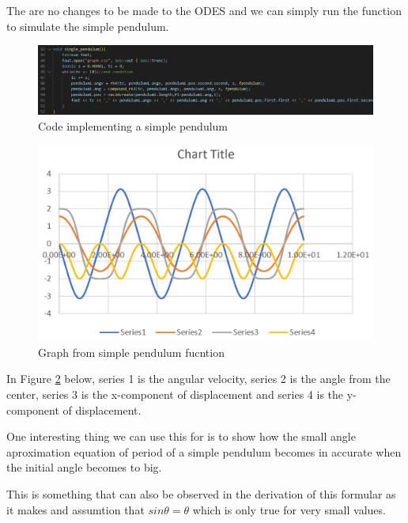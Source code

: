 \documentclass[12pt, a2paper]{article}
\begin{document}
The are no changes to be made to the ODES and we can simply run the function to simulate the simple pendulum.
\begin{figure}[h]
\center
\includegraphics[width=1\textwidth]{Simple pendulum function}
\caption{Code implementing a simple pendulum}
\label{fig 4}
\end{figure}
\begin{figure}[h]
\center
\includegraphics[width=1\textwidth]{Simple pendulum graph}
\caption{Graph from simple pendulum fucntion}
\label{Graph 3}
\end{figure}
\pagebreak

In Figure \ref{Graph 3}  below, series 1 is the angular velocity, series 2 is the angle from the center, series 3 is the x-component of displacement and series 4 is the y-component of displacement.

One interesting thing we can use this for is to show how the small angle aproximation equation of period of a simple pendulum becomes in accurate when the initial angle becomes to big. 

This is something that can also be observed in the derivation of this formular as it makes and assumtion that \(sin\theta = \theta\) which is only true for very small values.
\end{document}
